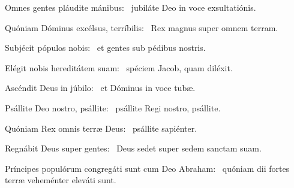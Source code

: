 \item Omnes gentes pláudite mánibus:~\psstar{} jubiláte Deo in voce exsultatiónis.

\item Quóniam Dóminus excélsus, terríbilis:~\psstar{} Rex magnus super omnem terram.

\item Subjécit pópulos nobis:~\psstar{} et gentes sub pédibus nostris.

\item Elégit nobis hereditátem suam:~\psstar{} spéciem Jacob, quam diléxit.

\item Ascéndit Deus in júbilo:~\psstar{} et Dóminus in voce tubæ.

\item Psállite Deo nostro, psállite:~\psstar{} psállite Regi nostro, psállite.

\item Quóniam Rex omnis terræ Deus:~\psstar{} psállite sapiénter.

\item Regnábit Deus super gentes:~\psstar{} Deus sedet super sedem sanctam suam.

\item Príncipes populórum congre\-gáti sunt cum Deo Abraham:~\psstar{} quóniam dii fortes terræ veheménter eleváti sunt.

